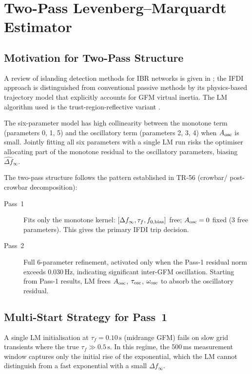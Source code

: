 \documentclass[11pt, a4paper]{article}
\newcommand{\dfhat}{\widehat{\Delta f}_\infty}
\begin{document}
\section{Two-Pass Levenberg--Marquardt Estimator}
\label{sec:estimator}

\subsection{Motivation for Two-Pass Structure}

A review of islanding detection methods for IBR networks is given in
\cite{Pietzcker2022}; the IFDI approach is distinguished from conventional
passive methods \cite{Ropp2000, Lopes2006} by its physics-based trajectory
model that explicitly accounts for GFM virtual inertia.  The LM algorithm
used is the trust-region-reflective variant \cite{More1978}.

The six-parameter model has high collinearity between the monotone term
(parameters 0, 1, 5) and the oscillatory term (parameters 2, 3, 4) when
$A_{\rm osc}$ is small.  Jointly fitting all six parameters with a single LM
run risks the optimiser allocating part of the monotone residual to the
oscillatory parameters, biasing $\dfhat$.

The two-pass structure follows the pattern established in TR-56 (crowbar/
post-crowbar decomposition):
\begin{description}
  \item[Pass~1] Fits only the monotone kernel: $[\Delta f_\infty, \tau_f,
    f_{0,\rm bias}]$ free; $A_{\rm osc} = 0$ fixed (3 free parameters).
    This gives the primary IFDI trip decision.

  \item[Pass~2] Full 6-parameter refinement, activated only when the
    Pass-1 residual norm exceeds $0.030\,\text{Hz}$, indicating significant
    inter-GFM oscillation.  Starting from Pass-1 results, LM frees
    $A_{\rm osc}$, $\tau_{\rm osc}$, $\omega_{\rm osc}$ to absorb the
    oscillatory residual.
\end{description}

\subsection{Multi-Start Strategy for Pass~1}

A single LM initialisation at $\tau_f = 0.10\,\text{s}$ (midrange GFM)
fails on slow grid transients where the true $\tau_f \gg 0.5\,\text{s}$.
In this regime, the 500\,ms measurement window captures only the initial
rise of the exponential, which the LM cannot distinguish from a fast
exponential with a small $\Delta f_\infty$.
\end{document}
